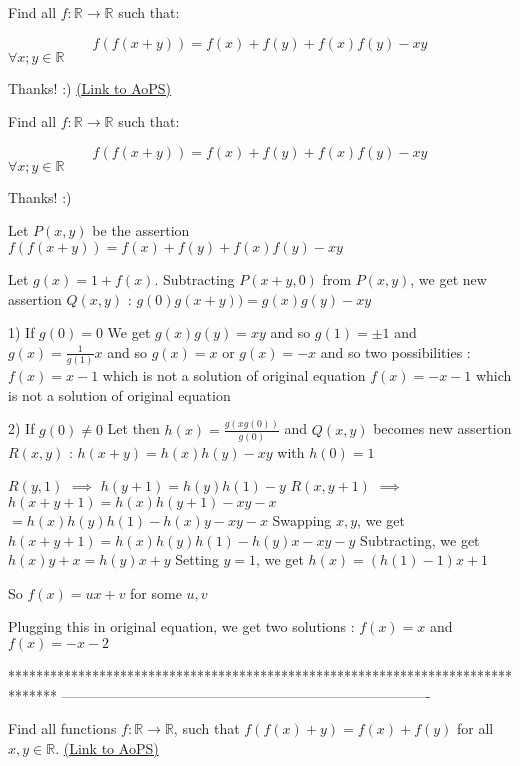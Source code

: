 \begin{problem}
	Find all $f: \mathbb{R} \to \mathbb{R}$ such that:

\[f(f(x+y)) = f(x) + f(y) +f(x)f(y) - xy\] $\forall x;y \in \mathbb{R}$

Thanks! :)
	\flushright \href{https://artofproblemsolving.com/community/c6h544799}{(Link to AoPS)}
\end{problem}



\begin{solution}
	\begin{tcolorbox}Find all $f: \mathbb{R} \to \mathbb{R}$ such that:

\[f(f(x+y)) = f(x) + f(y) +f(x)f(y) - xy\] $\forall x;y \in \mathbb{R}$

Thanks! :)\end{tcolorbox}
Let $P(x,y)$ be the assertion $f(f(x+y))=f(x)+f(y)+f(x)f(y)-xy$

Let $g(x)=1+f(x)$. Subtracting $P(x+y,0)$ from $P(x,y)$, we get new assertion $Q(x,y)$ : $g(0)g(x+y))=g(x)g(y)-xy$

1) If $g(0)=0$
We get $g(x)g(y)=xy$ and so $g(1)=\pm 1$ and $g(x)=\frac 1{g(1)}x$ and so $g(x)=x$ or $g(x)=-x$ and so two possibilities :
$f(x)=x-1$ which is not a solution of original equation
$f(x)=-x-1$ which is not a solution of original equation

2) If $g(0)\ne 0$
Let then $h(x)=\frac{g(xg(0))}{g(0)}$ and $Q(x,y)$ becomes new assertion $R(x,y)$ : $h(x+y)=h(x)h(y)-xy$ with $h(0)=1$

$R(y,1)$ $\implies$ $h(y+1)=h(y)h(1)-y$
$R(x,y+1)$ $\implies$ $h(x+y+1)=h(x)h(y+1)-xy-x$ $=h(x)h(y)h(1)-h(x)y-xy-x$
Swapping $x,y$, we get $h(x+y+1)=h(x)h(y)h(1)-h(y)x-xy-y$
Subtracting, we get $h(x)y+x=h(y)x+y$
Setting $y=1$, we get $h(x)=(h(1)-1)x+1$

So $f(x)=ux+v$ for some $u,v$

Plugging this in original equation, we get two solutions : $\boxed{f(x)=x}$ and $\boxed{f(x)=-x-2}$
\end{solution}
*******************************************************************************
-------------------------------------------------------------------------------

\begin{problem}
	Find all functions  $f: \mathbb{R}\to \mathbb{R}$, such that $f(f(x)+y) = f(x)+f(y)$ for all $x,y \in \mathbb{R}$.
	\flushright \href{https://artofproblemsolving.com/community/c6h544838}{(Link to AoPS)}
\end{problem}



